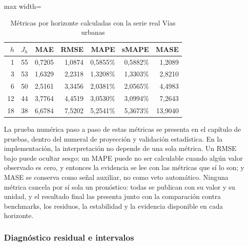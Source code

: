 \documentclass[12pt,letterpaper]{article}
\begin{document}
\begin{table}[H]
\centering
\caption{Métricas por horizonte calculadas con la serie real Vías urbanas}
\label{tab:metricas_reales_por_horizonte}
\vspace{\baselineskip}
\scriptsize
\begin{adjustbox}{max width=\textwidth}
\begin{tabular}{rrrrrrr}
\toprule
\textbf{\(h\)} & \textbf{\(J_h\)} & \textbf{MAE} & \textbf{RMSE} & \textbf{MAPE} & \textbf{sMAPE} & \textbf{MASE} \\
\midrule
1 & 55 & 0,7205 & 1,0874 & 0,5855\% & 0,5882\% & 1,2089 \\
3 & 53 & 1,6329 & 2,2318 & 1,3208\% & 1,3303\% & 2,8210 \\
6 & 50 & 2,5161 & 3,3456 & 2,0381\% & 2,0565\% & 4,4983 \\
12 & 44 & 3,7764 & 4,4519 & 3,0530\% & 3,0994\% & 7,2643 \\
18 & 38 & 6,6784 & 7,5202 & 5,2541\% & 5,3673\% & 13,9040 \\
\bottomrule
\end{tabular}
\end{adjustbox}
\end{table}

La prueba numérica paso a paso de estas métricas se presenta en el capítulo de pruebas, dentro del numeral de proyección y validación estadística. En la implementación, la interpretación no depende de una sola métrica. Un RMSE bajo puede ocultar sesgo; un MAPE puede no ser calculable cuando algún valor observado es cero, y entonces la evidencia se lee con las métricas que sí lo son; y MASE se conserva como señal auxiliar, no como veto automático. Ninguna métrica cancela por sí sola un pronóstico: todas se publican con su valor y su unidad, y el resultado final las presenta junto con la comparación contra benchmarks, los residuos, la estabilidad y la evidencia disponible en cada horizonte.

\subsubsection{Diagnóstico residual e intervalos}
\end{document}
